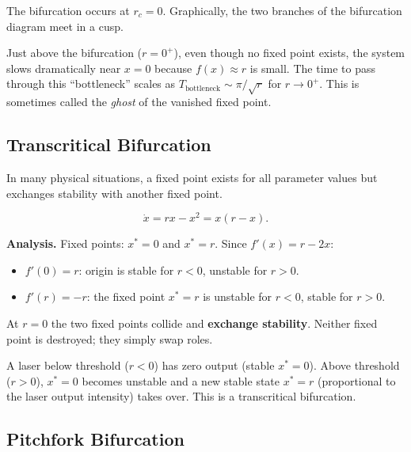 \documentclass[11pt,letterpaper]{article}
\theoremstyle{definition}
\theoremstyle{plain}
\theoremstyle{remark}
\newcommand{\xdot}{\dot{x}}
\newcommand{\xstar}{x^*}
\begin{document}
The bifurcation occurs at $r_c = 0$.  Graphically, the two branches of the
bifurcation diagram meet in a cusp.

\begin{physicalnote}
Just above the bifurcation ($r = 0^+$), even though no fixed point exists,
the system slows dramatically near $x=0$ because $f(x)\approx r$ is small.
The time to pass through this ``bottleneck'' scales as
$T_{\text{bottleneck}} \sim \pi/\sqrt{r}$ for $r\to 0^+$.
This is sometimes called the \emph{ghost} of the vanished fixed point.
\end{physicalnote}

\subsection{Transcritical Bifurcation}\label{sec:transcritical}

In many physical situations, a fixed point exists for all parameter values
but exchanges stability with another fixed point.

\begin{keyresult}
\begin{equation}\label{eq:tc-normal}
  \xdot = rx - x^2 = x(r-x).
\end{equation}
\end{keyresult}

\noindent\textbf{Analysis.}  Fixed points: $\xstar = 0$ and $\xstar = r$.
Since $f'(x) = r - 2x$:
\begin{itemize}[leftmargin=2em]
\item $f'(0) = r$: origin is stable for $r<0$, unstable for $r>0$.
\item $f'(r) = -r$: the fixed point $\xstar=r$ is unstable for $r<0$,
      stable for $r>0$.
\end{itemize}

At $r=0$ the two fixed points collide and \textbf{exchange stability}.
Neither fixed point is destroyed; they simply swap roles.

\begin{physicalnote}
A laser below threshold ($r<0$) has zero output (stable $\xstar=0$).
Above threshold ($r>0$), $\xstar=0$ becomes unstable and a new stable
state $\xstar=r$ (proportional to the laser output intensity) takes over.
This is a transcritical bifurcation.
\end{physicalnote}

\subsection{Pitchfork Bifurcation}\label{sec:pitchfork}
\end{document}
